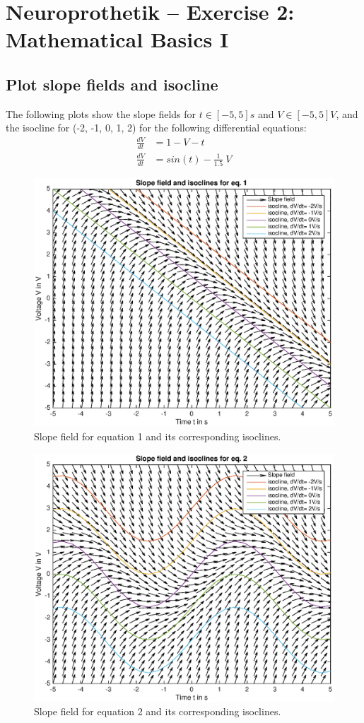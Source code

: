 \documentclass[
a4paper, 
12pt, 
]{article}
\begin{document}
	
	\thispagestyle{firstpage} 			%
	
	\section*{Neuroprothetik -- Exercise 2: Mathematical Basics I}
	\subsection{Plot slope fields and isocline}
	The following plots show the slope fields for $t \in [-5, 5]s$ and $V \in [-5, 5]V$, and the isocline for (-2, -1, 0, 1, 2) for the following differential equations: 
	\begin{align}
	\frac{dV}{dt} &= 1 - V - t\\
	\frac{dV}{dt} &= sin(t) - \frac{1}{1.5}~V
	\end{align}
\begin{figure}[h]
\centering
\includegraphics[width=0.85\linewidth]{Plots/eq1_plot}
\caption{Slope field for equation 1 and its corresponding isoclines.}
\label{fig:eq1_plot}
\end{figure}

\begin{figure}[h]
	\centering
	\includegraphics[width=0.85\linewidth]{Plots/eq2_plot}
	\caption{Slope field for equation 2 and its corresponding isoclines.}
	\label{fig:eq2_plot}
\end{figure}
\end{document}
